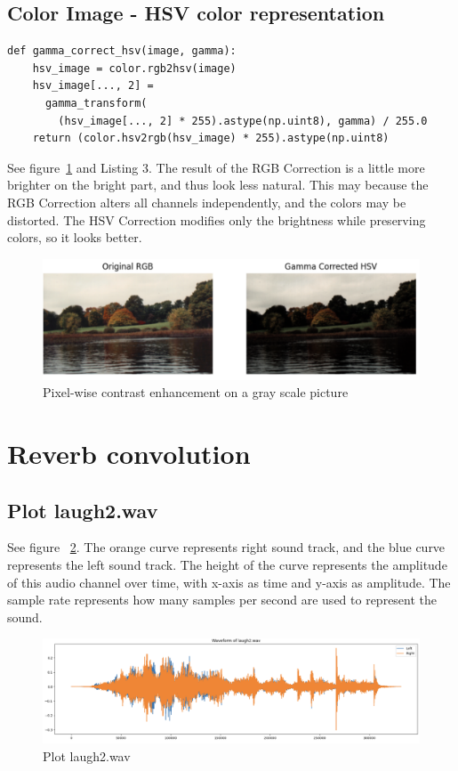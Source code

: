 \documentclass[12pt]{article}
\begin{document}
\subsection{Color Image - HSV color representation}

\begin{lstlisting}[caption={Gamma-HSV},captionpos=b]
def gamma_correct_hsv(image, gamma):
    hsv_image = color.rgb2hsv(image)
    hsv_image[..., 2] = 
      gamma_transform(
      	(hsv_image[..., 2] * 255).astype(np.uint8), gamma) / 255.0
    return (color.hsv2rgb(hsv_image) * 255).astype(np.uint8)
\end{lstlisting}

 See figure~\ref{fig:1.3} and Listing 3.
 The result of the RGB Correction is a little more brighter on the bright part, and thus look less natural. This may because the RGB Correction alters all channels independently, and the colors may be distorted. The HSV Correction modifies only the brightness while preserving colors, so it looks better.

\begin{figure}[ht]
\centering
    \includegraphics[width=0.7\columnwidth, keepaspectratio]{pics/a2-1.3}
\caption[]{Pixel-wise contrast enhancement on a gray scale picture}
\label{fig:1.3}
\end{figure}

\section{Reverb convolution}
\subsection{Plot laugh2.wav}
See figure ~\ref{fig:2.1}. The orange curve represents right sound track, and the blue curve represents the left sound track. The height of the curve represents the amplitude of this audio channel over time, with x-axis as time and y-axis as amplitude.
The sample rate represents how many samples per second are used to represent the sound.

\begin{figure}[ht]
\centering
    \includegraphics[width=0.7\columnwidth, keepaspectratio]{pics/a2-2.1}
\caption[]{Plot laugh2.wav}
\label{fig:2.1}
\end{figure}
\end{document}

